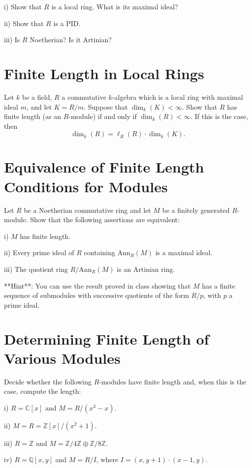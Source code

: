\documentclass[lang=cn,11pt]{template}
\begin{document}
i) Show that \( R \) is a local ring. What is its maximal ideal?

ii) Show that \( R \) is a PID.

iii) Is \( R \) Noetherian? Is it Artinian?

\section{Finite Length in Local Rings}
Let \( k \) be a field, \( R \) a commutative \( k \)-algebra which is a local ring with maximal ideal \( m \), and let \( K = R/m \). Suppose that \( \dim_k(K) < \infty \). Show that \( R \) has finite length (as an \( R \)-module) if and only if \( \dim_k(R) < \infty \). If this is the case, then
\[
\dim_k(R) = \ell_R(R) \cdot \dim_k(K).
\]

\section{Equivalence of Finite Length Conditions for Modules}
Let \( R \) be a Noetherian commutative ring and let \( M \) be a finitely generated \( R \)-module. Show that the following assertions are equivalent:

i) \( M \) has finite length.

ii) Every prime ideal of \( R \) containing \( \text{Ann}_R(M) \) is a maximal ideal.

iii) The quotient ring \( R/\text{Ann}_R(M) \) is an Artinian ring.

**Hint**: You can use the result proved in class showing that \( M \) has a finite sequence of submodules with successive quotients of the form \( R/p \), with \( p \) a prime ideal.

\section{Determining Finite Length of Various Modules}
Decide whether the following \( R \)-modules have finite length and, when this is the case, compute the length:

i) \( R = \mathbb{C}[x] \) and \( M = R/(x^3 - x) \).

ii) \( M = R = \mathbb{Z}[x]/(x^2 + 1) \).

iii) \( R = \mathbb{Z} \) and \( M = \mathbb{Z}/4\mathbb{Z} \oplus \mathbb{Z}/8\mathbb{Z} \).

iv) \( R = \mathbb{Q}[x, y] \) and \( M = R/I \), where \( I = (x, y + 1) \cdot (x - 1, y) \).
\end{document}
